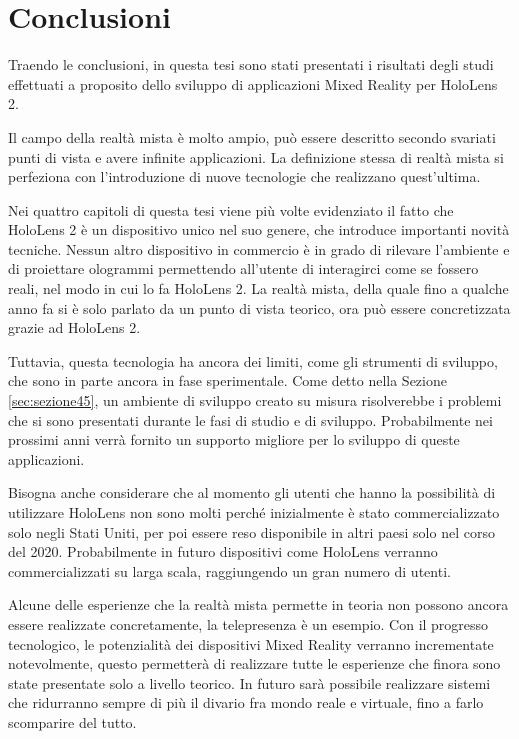 \chapter*{Conclusioni}
Traendo le conclusioni, in questa tesi sono stati presentati i risultati degli studi effettuati a proposito dello sviluppo di applicazioni Mixed Reality per HoloLens 2.

Il campo della realtà mista è molto ampio, può essere descritto secondo svariati punti di vista e avere infinite applicazioni.
La definizione stessa di realtà mista si perfeziona con l'introduzione di nuove tecnologie che realizzano quest'ultima.

Nei quattro capitoli di questa tesi viene più volte evidenziato il fatto che HoloLens 2 è un dispositivo unico nel suo genere, che introduce importanti novità tecniche.
Nessun altro dispositivo in commercio è in grado di rilevare l'ambiente e di proiettare ologrammi permettendo all'utente di interagirci come se fossero reali, nel modo in cui lo fa HoloLens 2.
La realtà mista, della quale fino a qualche anno fa si è solo parlato da un punto di vista teorico, ora può essere concretizzata grazie ad HoloLens 2.

Tuttavia, questa tecnologia ha ancora dei limiti, come gli strumenti di sviluppo, che sono in parte ancora in fase sperimentale.
Come detto nella Sezione \ref{sec:sezione45}, un ambiente di sviluppo creato su misura risolverebbe i problemi che si sono presentati durante le fasi di studio e di sviluppo.
Probabilmente nei prossimi anni verrà fornito un supporto migliore per lo sviluppo di queste applicazioni.

Bisogna anche considerare che al momento gli utenti che hanno la possibilità di utilizzare HoloLens non sono molti perché inizialmente è stato commercializzato solo negli Stati Uniti, per poi essere reso disponibile in altri paesi solo nel corso del 2020.
Probabilmente in futuro dispositivi come HoloLens verranno commercializzati su larga scala, raggiungendo un gran numero di utenti.

Alcune delle esperienze che la realtà mista permette in teoria non possono ancora essere realizzate concretamente, la telepresenza è un esempio.
Con il progresso tecnologico, le potenzialità dei dispositivi Mixed Reality verranno incrementate notevolmente, questo permetterà di realizzare tutte le esperienze che finora sono state presentate solo a livello teorico.
In futuro sarà possibile realizzare sistemi che ridurranno sempre di più il divario fra mondo reale e virtuale, fino a farlo scomparire del tutto.